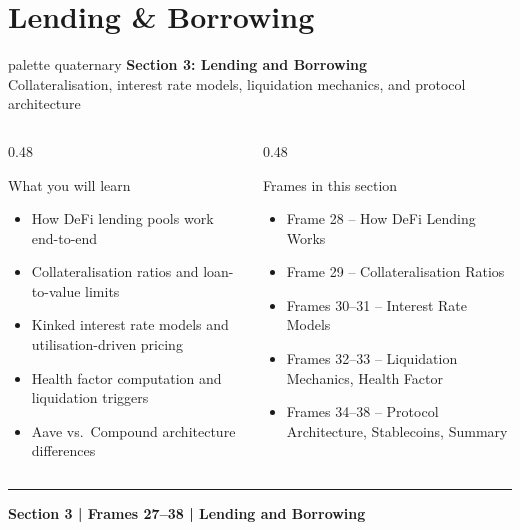 \documentclass[8pt,aspectratio=169]{beamer}
\newcommand{\bottomnote}[1]{\vfill\vspace{-2mm}\textcolor{mllavender2}{\rule{\textwidth}{0.4pt}}\vspace{1mm}\footnotesize\textbf{#1}}
\begin{document}

\section{Lending \& Borrowing}

\begin{frame}
  \begin{beamercolorbox}[sep=12pt,center,rounded=true,shadow=true]{palette quaternary}
    {\Large\bfseries Section 3: Lending and Borrowing}\\{}\vspace{6pt}
    {\normalsize Collateralisation, interest rate models, liquidation mechanics, and protocol architecture}
  \end{beamercolorbox}
  \vspace{8mm}
  \begin{columns}[T]
    \begin{column}{0.48\textwidth}
      \begin{block}{What you will learn}
        \begin{itemize}\setlength\itemsep{2pt}
          \item How DeFi lending pools work end-to-end
          \item Collateralisation ratios and loan-to-value limits
          \item Kinked interest rate models and utilisation-driven pricing
          \item Health factor computation and liquidation triggers
          \item Aave vs.\ Compound architecture differences
        \end{itemize}
      \end{block}
    \end{column}
    \begin{column}{0.48\textwidth}
      \begin{block}{Frames in this section}
        \begin{itemize}\setlength\itemsep{2pt}
          \item Frame 28 -- How DeFi Lending Works
          \item Frame 29 -- Collateralisation Ratios
          \item Frames 30--31 -- Interest Rate Models
          \item Frames 32--33 -- Liquidation Mechanics, Health Factor
          \item Frames 34--38 -- Protocol Architecture, Stablecoins, Summary
        \end{itemize}
      \end{block}
    \end{column}
  \end{columns}
  \bottomnote{Section 3 | Frames 27--38 | Lending and Borrowing}
\end{frame}
\end{document}
